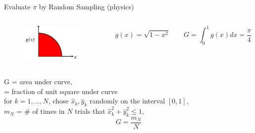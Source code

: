 \documentclass[xcolor=x11names,compress,handout]{beamer}
\renewcommand{\(}{\begin{columns}}
\renewcommand{\)}{\end{columns}}
\newcommand{\<}[1]{\begin{column}{#1}}
\renewcommand{\>}{\end{column}}
\begin{document}
\begin{frame}{Evaluate $\pi$ by Random Sampling (physics)}

\begin{columns}
  \begin{column}{0.3\textwidth}
  	\begin{figure}
  	\begin{center}
  		\includegraphics[height=0.75in,clip]{fig/quarter-circle}
	\end{center}
  	\end{figure}
  \end{column}
  \begin{column}{0.7\textwidth}
    \begin{equation}
      g(x) = \sqrt{1 - x^2}	\qquad G = \int_0^1 g(x)dx = \frac{\pi}{4} \nonumber
    \end{equation}
  \end{column}
\end{columns}

\vspace*{0.5em}
G = area under curve, \\
\hspace*{0.75 em} = fraction of unit square under curve\\
\vspace*{0.5em}
\hspace*{2 em}for $k = 1, \dots, N$, chose $\hat{x}_k, \hat{y}_k$ randomly on the interval $[0,1]$,\\
\vspace*{0.5em}
$m_N$ = $\#$ of times in $N$ trials that $\hat{x}_k^2 + \hat{y}_k^2 \leq 1$,
\[G = \frac{m_N}{N}\]

\end{frame}
\end{document}
